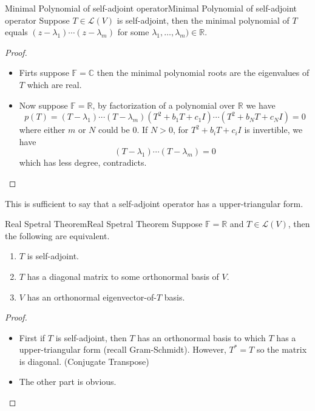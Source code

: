 \documentclass[../main.tex]{subfiles}
\begin{document}
\begin{lemma}{Minimal Polynomial of self-adjoint operator}{Minimal Polynomial of self-adjoint operator}
Suppose $T\in \mathscr{L}(V)$ is self-adjoint, then the minimal polynomial of $T$ equals $(z-\lambda_1) \cdots (z-\lambda_m)$ for some $\lambda_1, \ldots ,\lambda_m) \in \mathbb{R}$.
\end{lemma}
\begin{proof}
\begin{itemize}
\item Firts suppose $\mathbb{F}=\mathbb{C}$ then the minimal polynomial roots are the eigenvalues of $T$ which are real.
\item Now suppose $\mathbb{F}=\mathbb{R}$, by factorization of a polynomial over $\mathbb{R}$ we have
	\begin{equation*}
	p(T) = (T-\lambda_1) \cdots (T-\lambda_m) (T^2+b_1T+c_1I) \cdots (T^2+b_NT+c_NI) =0
	\end{equation*}
	where either $m$ or $N$ could be $0$. If $N>0$, for  $T^2+b_iT+c_iI$ is invertible, we have
	\begin{equation*}
		(T-\lambda_1) \cdots (T-\lambda_m)=0
	\end{equation*}
	which has less degree, contradicts.
\end{itemize}
\end{proof}

This is sufficient to say that a self-adjoint operator has a upper-triangular form.

\begin{theorem}{Real Spetral Theorem}{Real Spetral Theorem}
Suppose $\mathbb{F}=\mathbb{R}$ and $T\in \mathscr{L}(V)$, then the following are equivalent.
\begin{enumerate}
	\item $T$ is self-adjoint.
	\item $T$ has a diagonal matrix to some orthonormal basis of $V$.
	\item $V$ has an orthonormal eigenvector-of-$T$ basis.
\end{enumerate}
\end{theorem}
\begin{proof}
\begin{itemize}
\item First if $T$ is self-adjoint, then $T$ has an orthonormal basis to which $T$ has a upper-triangular form (recall Gram-Schmidt). However, $T^*=T$ so the matrix is diagonal. (Conjugate Transpose)
\item The other part is obvious.
\end{itemize}
\end{proof}
\end{document}
